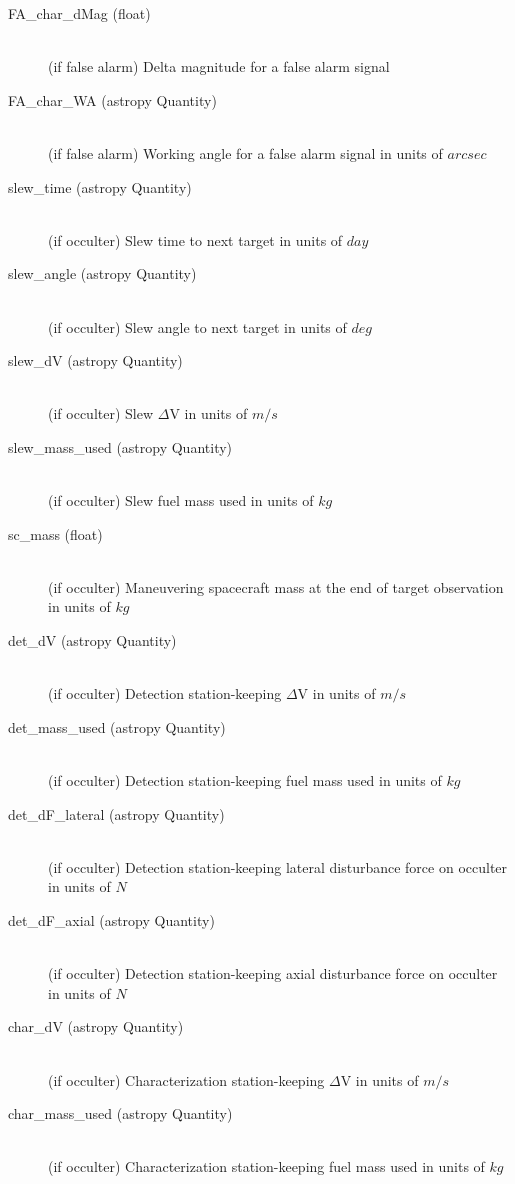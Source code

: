 \documentclass[cleanfoot]{asme2ej}
\begin{document}
\begin{itemize}
\begin{description}
\begin{description}
        \item[FA\_char\_dMag (float)] \hfill \\ (if false alarm) Delta magnitude for a false alarm signal
        \item[FA\_char\_WA (astropy Quantity)] \hfill \\ (if false alarm) Working angle for a false alarm signal in units of $arcsec$
        \item[slew\_time (astropy Quantity)] \hfill \\ (if occulter) Slew time to next target in units of $ day $
        \item[slew\_angle (astropy Quantity)] \hfill \\ (if occulter) Slew angle to next target in units of $ deg $
        \item[slew\_dV (astropy Quantity)] \hfill \\ (if occulter) Slew $\Delta$V in units of $ m/s $
        \item[slew\_mass\_used (astropy Quantity)] \hfill \\ (if occulter) Slew fuel mass used in units of $ kg $
        \item[sc\_mass (float)] \hfill \\ (if occulter) Maneuvering spacecraft mass at the end of target observation in units of $kg$
        \item[det\_dV (astropy Quantity)] \hfill \\ (if occulter) Detection station-keeping $\Delta$V in units of $ m/s $
        \item[det\_mass\_used (astropy Quantity)] \hfill \\ (if occulter) Detection station-keeping fuel mass used in units of $ kg $
        \item[det\_dF\_lateral (astropy Quantity)] \hfill \\ (if occulter) Detection station-keeping lateral disturbance force on occulter in units of $ N $
        \item[det\_dF\_axial (astropy Quantity)] \hfill \\ (if occulter) Detection station-keeping axial disturbance force on occulter in units of $ N $
        \item[char\_dV (astropy Quantity)] \hfill \\ (if occulter) Characterization station-keeping $\Delta$V in units of $ m/s $
        \item[char\_mass\_used (astropy Quantity)] \hfill \\ (if occulter) Characterization station-keeping fuel mass used in units of $ kg $

\end{description}
\end{description}
\end{itemize}
\end{document}
